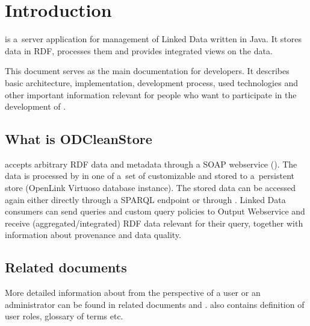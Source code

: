
\newcommand{\version}{0.3.6}
\newcommand{\documentname}{\refprogrammersguide}






\renewcommand{\contentsname}{Contents}
\tableofcontents
\bigskip

\newpage




\chapter{Introduction}
\odcs is a~server application for management of Linked Data written in Java. It stores data in RDF, processes them and provides integrated views on the data.

This document serves as the main documentation for developers. It describes basic architecture, implementation, development process, used technologies and other important information relevant for people who want to participate in the development of \odcs.

\section{What is ODCleanStore}
\odcs accepts arbitrary RDF data and metadata through a SOAP webservice (). The data is processed by  in one of a~set of customizable  and stored to a~persistent store (OpenLink Virtuoso database instance). The stored data can be accessed again either  directly through a SPARQL endpoint or through . Linked Data consumers can send queries and custom query policies to Output Webservice and receive (aggregated/integrated) RDF data relevant for their query, together with information about provenance and data quality. 

\section{Related documents}
More detailed information about \odcs from the perspective of a user or an administrator can be found in related documents  and .  also contains definition of user roles, glossary of terms etc.

